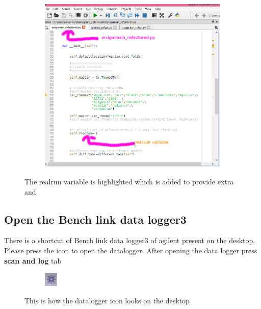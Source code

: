 \documentclass[12pt]{article}
\begin{document}
  
  
   
  \begin{figure}[H]
 
    \begin{subfigure}{1\textwidth}
    \includegraphics[scale=0.5]{images/realrun.png} 
    \label{fig:DJp1}
    \end{subfigure}
 \caption{The realrun variable is highlighted which is added to provide extra and }
\label{fig6}
\end{figure} 
   
 
 
 \subsection{Open the Bench link data logger3 }
 There is a shortcut of  Bench link data logger3 of agilent present on the desktop. Please press the icon to open the datalogger. After opening the data logger press \textbf{scan and log} tab 
 
 \begin{figure}[H]
    \centering
    \begin{subfigure}{1\textwidth}
    \includegraphics[scale=4]{images/dataloggericon.png}
    \label{fig:DJp1}
    \end{subfigure}
 \caption{This is how the datalogger icon looks on the desktop}
\label{fig6}
\end{figure}
 
\end{document}
